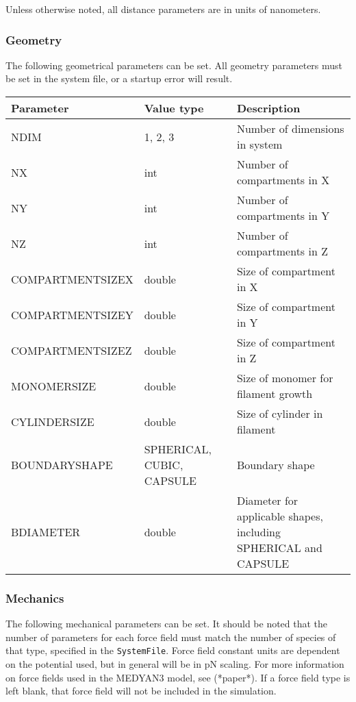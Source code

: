 \documentclass[11pt, oneside]{article}   	%
\begin{document}
 \noindent Unless otherwise noted, all distance parameters are in units of nanometers. 

\subsubsection{Geometry}

The following geometrical parameters can be set. All geometry parameters must be set in the system file, or a startup error will result. 

\begin{table} [!ht]
\centering
\begin{tabular}{|L{5cm}|C{3cm}|L{5.2cm}|}  
\hline
 \textbf{Parameter} & \textbf{Value type} & \textbf{Description} \\
 \hline
  NDIM & 1, 2, 3 & Number of dimensions in system \\
  \hline
  NX & int & Number of compartments in X \\
  \hline
  NY & int & Number of compartments in Y \\
  \hline
  NZ & int & Number of compartments in Z \\
  \hline
  COMPARTMENTSIZEX & double & Size of compartment in X \\
  \hline
  COMPARTMENTSIZEY & double & Size of compartment in Y \\
  \hline
  COMPARTMENTSIZEZ & double & Size of compartment in Z \\
  \hline
  MONOMERSIZE & double & Size of monomer for filament growth \\
  \hline
  CYLINDERSIZE & double & Size of cylinder in filament\\
  \hline
  BOUNDARYSHAPE & SPHERICAL, CUBIC, CAPSULE & Boundary shape \\
  \hline
  BDIAMETER & double & Diameter for applicable shapes, including SPHERICAL and CAPSULE \\
  \hline

\end{tabular}
\end{table}

\break
\subsubsection{Mechanics}

The following mechanical parameters can be set. It should be noted that the number of parameters for each force field must match the number of species of that type, specified in the \texttt{SystemFile}. Force field constant units are dependent on the potential used, but in general will be in pN scaling. For more information on force fields used in the MEDYAN3 model, see (*paper*). If a force field type is left blank, that force field will not be included in the simulation.
\end{document}
